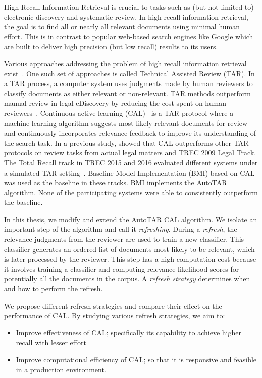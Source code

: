 High Recall Information Retrieval is crucial to tasks such as (but not limited
to) electronic discovery and systematic review. In high recall information
retrieval, the goal is to find all or nearly all relevant documents using
minimal human effort. This is in contrast to popular web-based search engines
like Google which are built to deliver high precision (but low recall) results
to its users.

Various approaches addressing the problem of high recall information retrieval
exist~\cite{}. One such set of approaches is called Technical Assisted Review
(TAR).  In a TAR process, a computer system uses judgments made by human
reviewers to classify documents as either relevant or non-relevant. TAR methods
outperform manual review in legal eDiscovery by reducing the cost spent on human
reviewers~\cite{grossman2010technology,roitblat2010document}.   Continuous
active learning (CAL)~\cite{cormack2014evaluation} is a TAR protocol where a
machine learning algorithm suggests most likely relevant documents for review
and continuously incorporates relevance feedback to improve its understanding of
the search task.  In a previous study, \citet{cormack2014evaluation} showed that
CAL outperforms other TAR protocols on review tasks from actual legal matters
and TREC 2009 Legal Track.  The Total Recall track in TREC 2015 and 2016
evaluated different systems under a simulated TAR
setting~\cite{grossman2016trec,roegiest2015trec}.  Baseline Model Implementation
(BMI) based on CAL was used as the baseline in these tracks. BMI implements the
AutoTAR algorithm.  None of the participating systems were able to consistently
outperform the baseline.

In this thesis, we modify and extend the AutoTAR CAL algorithm. We isolate an
important step of the algorithm and call it \textit{refreshing}.  During a
\textit{refresh}, the relevance judgments from the reviewer are used to train a
new classifier. This classifier generates an ordered list of documents most
likely to be relevant, which is later processed by the reviewer. This step has a
high computation cost because it involves training a classifier and computing
relevance likelihood scores for potentially all the documents in the corpus. A
\textit{refresh strategy} determines when and how to perform the refresh.

We propose different refresh strategies and compare their effect on the
performance of CAL. By studying various refresh strategies, we aim to:
\begin{itemize} \item Improve effectiveness of CAL; specifically its capability
to achieve higher recall with lesser effort \item Improve computational
efficiency of CAL; so that it is responsive and  feasible in a production
environment.  \end{itemize}


